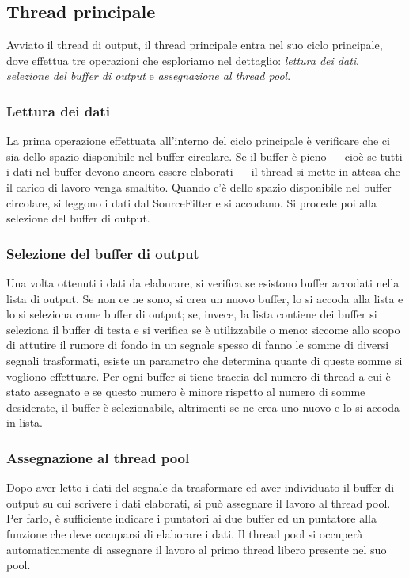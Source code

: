 \subsection{Thread principale}
\label{main_thread}
Avviato il thread di output, il thread principale entra nel suo ciclo
principale, dove effettua tre operazioni che esploriamo nel dettaglio:
\emph{lettura dei dati}, \emph{selezione del buffer di output} e
\emph{assegnazione al thread pool}.
\subsubsection{Lettura dei dati}
La prima operazione effettuata all'interno del ciclo principale \`e verificare
che ci sia dello spazio disponibile nel buffer circolare. Se il buffer \`e
pieno --- cio\`e se tutti i dati nel buffer devono ancora essere elaborati ---
il thread si mette in attesa che il carico di lavoro venga smaltito. Quando
c'\`e dello spazio disponibile nel buffer circolare, si leggono i dati
dal SourceFilter e si accodano. Si procede poi alla selezione del buffer di
output.
\subsubsection{Selezione del buffer di output}
Una volta ottenuti i dati da elaborare, si verifica se esistono buffer accodati
nella lista di output. Se non ce ne sono, si crea un nuovo buffer, lo si accoda
alla lista e lo si seleziona come buffer di output; se, invece, la lista
contiene dei buffer si seleziona il buffer di testa e si verifica se \`e
utilizzabile o meno: siccome allo scopo di attutire il rumore di fondo in un
segnale spesso di fanno le somme di diversi segnali trasformati, esiste un
parametro che determina quante di queste somme si vogliono effettuare. Per ogni
buffer si tiene traccia del numero di thread a cui \`e stato assegnato e se
questo numero \`e minore rispetto al numero di somme desiderate, il buffer \`e
selezionabile, altrimenti se ne crea uno nuovo e lo si accoda in lista.
\subsubsection{Assegnazione al thread pool}
Dopo aver letto i dati del segnale da trasformare ed aver individuato il buffer
di output su cui scrivere i dati elaborati, si pu\`o assegnare il lavoro al thread
pool. Per farlo, \`e sufficiente indicare i puntatori ai due buffer ed un
puntatore alla funzione che deve occuparsi di elaborare i dati. Il thread pool
si occuper\`a automaticamente di assegnare il lavoro al primo thread libero
presente nel suo pool.
